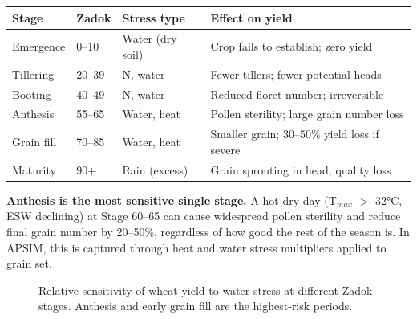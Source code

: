 \begin{center}
\begin{tabular}{l|l|l|l}
\textbf{Stage} & \textbf{Zadok} & \textbf{Stress type} & \textbf{Effect on yield} \\
\hline
Emergence     & 0--10  & Water (dry soil) & Crop fails to establish; zero yield \\
Tillering     & 20--39 & N, water         & Fewer tillers; fewer potential heads \\
Booting       & 40--49 & N, water         & Reduced floret number; irreversible \\
Anthesis      & 55--65 & Water, heat      & Pollen sterility; large grain number loss \\
Grain fill    & 70--85 & Water, heat      & Smaller grain; 30--50\% yield loss if severe \\
Maturity      & 90+    & Rain (excess)    & Grain sprouting in head; quality loss \\
\end{tabular}
\end{center}

\begin{keyconceptbox}
\textbf{Anthesis is the most sensitive single stage.} A hot dry day (T$_{max}$ $>$ 32°C, ESW declining) at Stage 60--65 can cause widespread pollen sterility and reduce final grain number by 20--50\%, regardless of how good the rest of the season is. In APSIM, this is captured through heat and water stress multipliers applied to grain set.
\end{keyconceptbox}

\begin{figure}[H]
  \centering
  \caption{Relative sensitivity of wheat yield to water stress at different Zadok stages. Anthesis and early grain fill are the highest-risk periods.}
  \label{fig:stress-sensitivity}
\end{figure}

